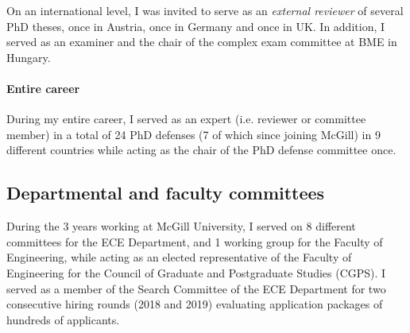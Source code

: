 On an international level, I was invited to serve as an \emph{external reviewer} of several PhD theses, once in Austria, once in Germany and once in UK. In addition, I served as an examiner and the chair of the complex exam committee at BME in Hungary. 

\paragraph{Entire career}
During my entire career, I served as an expert (i.e. reviewer or committee member) in a total of 24 PhD defenses (7 of which since joining McGill) in 9 different countries while acting as the chair of the PhD defense committee once. 

\subsection{Departmental and faculty committees}
During the 3 years working at McGill University, I served on 8 different committees for the ECE Department, and 1 working group for the Faculty of Engineering, while acting as an elected representative of the Faculty of Engineering for the Council of Graduate and Postgraduate Studies (CGPS). I served as a member of the Search Committee of the ECE Department for two consecutive hiring rounds (2018 and 2019) evaluating application packages of hundreds of applicants. 

